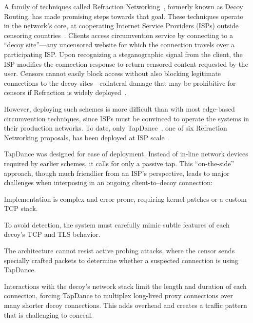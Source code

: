 \documentclass[sigconf]{acmart}
\begin{document}
A family of techniques called Refraction Networking~\cite{telex11,cirripede11,curveball11,tapdance14,rebound15,slitheen16,waterfall17}, formerly known
as Decoy Routing, has made promising steps towards that goal.
These techniques operate in the network's core, at cooperating Internet Service Providers
(ISPs) outside censoring countries~\cite{refraction-site}.  Clients access circumvention service by connecting to a ``decoy site''---any uncensored website for which the connection travels over a participating ISP\@.  Upon recognizing a steganographic signal from the client, the ISP modifies the connection response to return censored content requested by the user.
Censors cannot easily block access without also blocking legitimate connections to the decoy sites---collateral damage that may be prohibitive for censors if Refraction is widely deployed~\cite{robinson2013collateral}.

However, deploying such schemes is more difficult than with most
edge-based circumvention techniques, since ISPs must be convinced to
operate the systems in their production networks.  To date, only
TapDance~\cite{tapdance14}, one of six Refraction Networking
proposals, has been deployed at ISP scale~\cite{frolov2017isp}.

TapDance was designed for ease of deployment.
Instead of in-line network devices required by earlier schemes, it
calls for only a passive tap.
This ``on-the-side'' approach, though much friendlier from an ISP's
perspective, leads to major challenges when interposing in an ongoing
client-to--decoy connection:
\begin{compactitem}
\item Implementation is complex and error-prone, requiring kernel
  patches or a custom TCP stack.
\item To avoid detection, the system must carefully mimic
  subtle features of each decoy's TCP and TLS behavior.
\item The architecture cannot resist active probing attacks, where the
  censor sends specially crafted packets to determine whether a
  suspected connection is using TapDance.
\item Interactions with the decoy's network stack limit the length and
  duration of each connection, forcing TapDance to multiplex
  long-lived proxy connections over many shorter decoy
  connections. This adds overhead and creates a traffic pattern
  that is challenging to conceal.
\end{compactitem}
\end{document}
